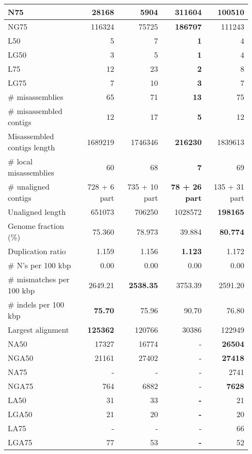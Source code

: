 \documentclass[12pt,a4paper]{article}
\begin{document}
\begin{table}[ht]
\begin{center}
\begin{tabular}{|l*{4}{|r}|}
N75 & 28168 & 5904 & {\bf 311604} & 100510 \\ \hline
NG75 & 116324 & 75725 & {\bf 186707} & 111243 \\ \hline
L50 & 5 & 7 & {\bf 1} & 4 \\ \hline
LG50 & 3 & 5 & {\bf 1} & 4 \\ \hline
L75 & 12 & 23 & {\bf 2} & 8 \\ \hline
LG75 & 7 & 10 & {\bf 3} & 7 \\ \hline
\# misassemblies & 65 & 71 & {\bf 13} & 75 \\ \hline
\# misassembled contigs & 12 & 17 & {\bf 5} & 12 \\ \hline
Misassembled contigs length & 1689219 & 1746346 & {\bf 216230} & 1839613 \\ \hline
\# local misassemblies & 60 & 68 & {\bf 7} & 69 \\ \hline
\# unaligned contigs & 728 + 6 part & 735 + 10 part & {\bf 78 + 26 part} & 135 + 31 part \\ \hline
Unaligned length & 651073 & 706250 & 1028572 & {\bf 198165} \\ \hline
Genome fraction (\%) & 75.360 & 78.973 & 39.884 & {\bf 80.774} \\ \hline
Duplication ratio & 1.159 & 1.156 & {\bf 1.123} & 1.172 \\ \hline
\# N's per 100 kbp & 0.00 & 0.00 & 0.00 & 0.00 \\ \hline
\# mismatches per 100 kbp & 2649.21 & {\bf 2538.35} & 3753.39 & 2591.20 \\ \hline
\# indels per 100 kbp & {\bf 75.70} & 75.96 & 90.70 & 76.80 \\ \hline
Largest alignment & {\bf 125362} & 120766 & 30386 & 122949 \\ \hline
NA50 & 17327 & 16774 & - & {\bf 26504} \\ \hline
NGA50 & 21161 & 27402 & - & {\bf 27418} \\ \hline
NA75 & - & - & - & 2741 \\ \hline
NGA75 & 764 & 6882 & - & {\bf 7628} \\ \hline
LA50 & 31 & 33 & {\bf -} & 21 \\ \hline
LGA50 & 21 & 20 & {\bf -} & 20 \\ \hline
LA75 & - & - & - & 66 \\ \hline
LGA75 & 77 & 53 & {\bf -} & 52 \\ \hline
\end{tabular}
\end{center}
\end{table}
\end{document}
